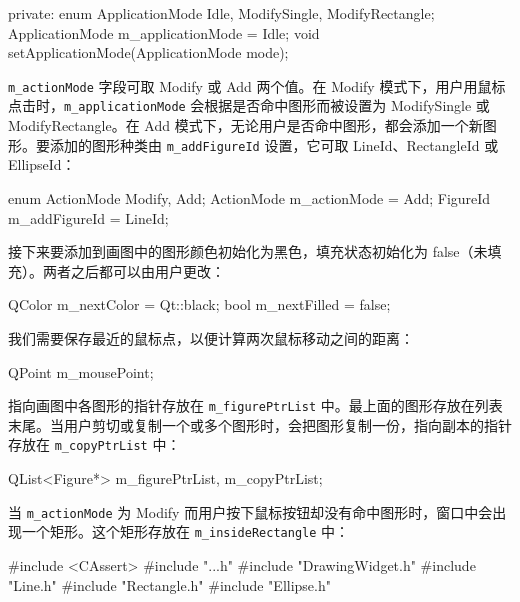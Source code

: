 \begin{codebox}
  private:
    enum ApplicationMode {Idle, ModifySingle, ModifyRectangle};
    ApplicationMode m_applicationMode = Idle;
    void setApplicationMode(ApplicationMode mode);
\end{codebox}

\texttt{m\_actionMode} 字段可取 Modify 或 Add 两个值。在 Modify 模式下，用户用鼠标点击时，\texttt{m\_applicationMode} 会根据是否命中图形而被设置为 ModifySingle 或 ModifyRectangle。在 Add 模式下，无论用户是否命中图形，都会添加一个新图形。要添加的图形种类由 \texttt{m\_addFigureId} 设置，它可取 LineId、RectangleId 或 EllipseId：

\begin{codebox}
    enum ActionMode {Modify, Add};
    ActionMode m_actionMode = Add;
    FigureId m_addFigureId = LineId;
\end{codebox}

接下来要添加到画图中的图形颜色初始化为黑色，填充状态初始化为 false（未填充）。两者之后都可以由用户更改：

\begin{codebox}
    QColor m_nextColor = Qt::black;
    bool m_nextFilled = false;
\end{codebox}

我们需要保存最近的鼠标点，以便计算两次鼠标移动之间的距离：

\begin{codebox}
    QPoint m_mousePoint;
\end{codebox}

指向画图中各图形的指针存放在 \texttt{m\_figurePtrList} 中。最上面的图形存放在列表末尾。当用户剪切或复制一个或多个图形时，会把图形复制一份，指向副本的指针存放在 \texttt{m\_copyPtrList} 中：

\begin{codebox}
    QList<Figure*> m_figurePtrList, m_copyPtrList;
\end{codebox}

当 \texttt{m\_actionMode} 为 Modify 而用户按下鼠标按钮却没有命中图形时，窗口中会出现一个矩形。这个矩形存放在 \texttt{m\_insideRectangle} 中：

\begin{codebox}
    QRect m_insideRectangle;
  };

#endif // DRAWINGWIDGET_H
\end{codebox}

\medskip{}

\begin{codebox}
#include <CAssert>
#include "..\MainWindow\DocumentWidget.h"
#include "DrawingWidget.h"
#include "Line.h"
#include "Rectangle.h"
#include "Ellipse.h"
\end{codebox}

